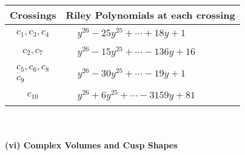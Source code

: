 \documentclass[1p]{elsarticle_modified}
\theoremstyle{definition}
\begin{document}
\begin{tabular}{m{50pt}|m{274pt}}
Crossings & \hspace{64pt}Riley Polynomials at each crossing \\
\hline $$\begin{aligned}c_{1},c_{3},c_{4}\end{aligned}$$&$\begin{aligned}
&y^{26}-25 y^{25}+\cdots+18 y+1
\end{aligned}$\\
\hline $$\begin{aligned}c_{2},c_{7}\end{aligned}$$&$\begin{aligned}
&y^{26}-15 y^{25}+\cdots-136 y+16
\end{aligned}$\\
\hline $$\begin{aligned}c_{5},c_{6},c_{8}\\c_{9}\end{aligned}$$&$\begin{aligned}
&y^{26}-30 y^{25}+\cdots-19 y+1
\end{aligned}$\\
\hline $$\begin{aligned}c_{10}\end{aligned}$$&$\begin{aligned}
&y^{26}+6 y^{25}+\cdots-3159 y+81
\end{aligned}$\\
\hline
\end{tabular}\\~\\
\newpage\flushleft \textbf{(vi) Complex Volumes and Cusp Shapes}
\end{document}
